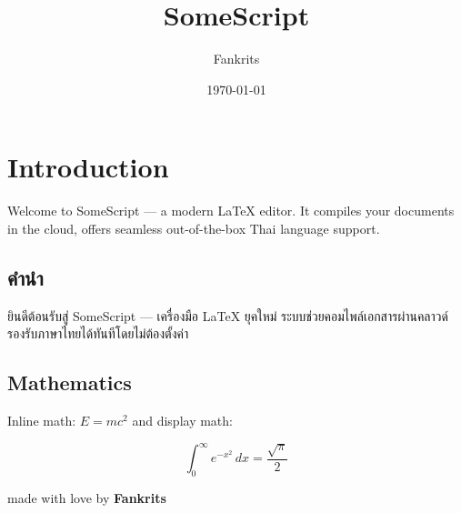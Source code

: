 \documentclass[12pt, a4paper]{article}
\title{SomeScript}
\author{Fankrits}
\date{\today}
\begin{document}
\maketitle

\section*{Introduction}

Welcome to SomeScript — a modern LaTeX editor. It compiles your documents in the cloud, offers seamless out-of-the-box Thai language support.

\subsection*{คำนำ}
ยินดีต้อนรับสู่ SomeScript — เครื่องมือ LaTeX ยุคใหม่ ระบบช่วยคอมไพล์เอกสารผ่านคลาวด์ รองรับภาษาไทยได้ทันทีโดยไม่ต้องตั้งค่า
\subsection*{Mathematics}
Inline math: $E = mc^2$ and display math:

\[
\int_{0}^{\infty} e^{-x^{2}}\,dx = \frac{\sqrt{\pi}}{2}
\]

\vspace{1cm}

\begin{center}
made with love by \textbf{Fankrits}
\end{center}
\end{document}
